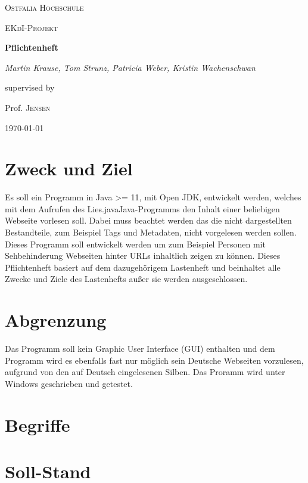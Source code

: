 \documentclass[12pt]{scrartcl}
\begin{document}
\begin{titlepage}
	\centering
	{\scshape\LARGE Ostfalia Hochschule \par}
	\vspace{1cm}
	{\scshape\Large EKdI-Projekt\par}
	\vspace{1.5cm}
	{\huge\bfseries Pflichtenheft\par}
	\vspace{2cm}
	{\Large\itshape Martin Krause, Tom Strunz, Patricia Weber, Kristin Wachenschwan\par}
	\vfill
	supervised by\par
	Prof. \textsc{Jensen}

	\vfill

	{\large \today\par}
\end{titlepage}


\tableofcontents
\newpage


\section{Zweck und Ziel}
Es soll ein Programm in Java >= 11, mit Open JDK, entwickelt werden, welches mit dem Aufrufen des \glqq Lies.java\grqq Java-Programms den Inhalt einer beliebigen Webseite vorlesen soll. Dabei muss beachtet werden das die nicht dargestellten Bestandteile, zum Beispiel Tags und Metadaten, nicht vorgelesen werden sollen. Dieses Programm soll entwickelt werden um zum Beispiel Personen mit Sehbehinderung Webseiten hinter URLs inhaltlich zeigen zu können. Dieses Pflichtenheft basiert auf dem dazugehörigem Lastenheft und beinhaltet alle Zwecke und Ziele des Lastenhefts außer sie werden ausgeschlossen.

\section{Abgrenzung}
Das Programm soll kein Graphic User Interface (GUI) enthalten und dem Programm wird es ebenfalls fast nur möglich sein Deutsche Webseiten vorzulesen, aufgrund von den auf Deutsch eingelesenen Silben. Das Proramm wird unter Windows geschrieben und getestet.

\section{Begriffe}


\section{Soll-Stand}
\end{document}
